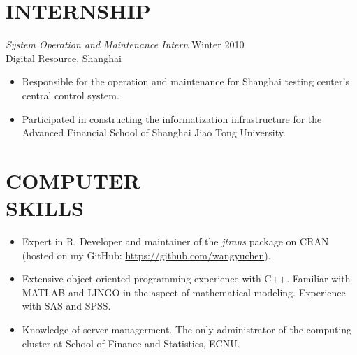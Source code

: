 \documentclass[margin]{res}
\begin{document}
\begin{resume}
		\section{INTERNSHIP} 
		{\sl System Operation and Maintenance Intern} \hfill Winter 2010 \\
		Digital Resource, Shanghai
		\begin{itemize}  \itemsep -2pt %
			\item Responsible for the operation and maintenance for Shanghai testing center's central control system.
			\item Participated in constructing the informatization infrastructure for the Advanced Financial School of Shanghai Jiao Tong University.
		\end{itemize} 
		
		\section{COMPUTER \\ SKILLS}
		\begin{itemize}  \itemsep -2pt %
			\item Expert in R. Developer and maintainer of the \emph{jtrans} package on CRAN (hosted on my GitHub: \url{https://github.com/wangyuchen}). 
			\item Extensive object-oriented programming experience with C++. Familiar with MATLAB and LINGO in the aspect of mathematical modeling. Experience with SAS and SPSS. 
			\item Knowledge of server managerment. The only administrator of the computing cluster at School of Finance and Statistics, ECNU. 
		\end{itemize}
		

	\end{resume}
\end{document}
